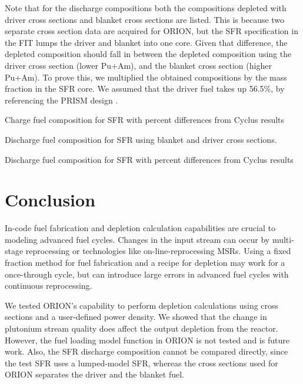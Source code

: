 \documentclass{article}
\begin{document}
Note that for the discharge compositions both the compositions depleted with driver
cross sections and blanket cross sections are listed. This is because two separate
cross section data are acquired for ORION, but the \gls{SFR} specification in the
FIT lumps the driver and blanket into one core. Given that difference, the depleted
composition should fall in between the depleted composition using the driver cross section (lower Pu+Am),
and the blanket cross section (higher Pu+Am). To prove this, we multiplied the
obtained compositions by the mass fraction in the \gls{SFR} core. We assumed that
the driver fuel takes up 56.5\%, by referencing the \gls{PRISM} design \cite{triplett_prism:_2012}.

\begin{table}[h]
    \centering
    \resizebox{\textwidth}{!}{
    }
    \caption{Charge fuel composition for \gls{SFR} with percent differences from
             Cyclus results}
    \label{fig:sfr_charge}
\end{table}


\begin{table}[h]
    \centering
    \resizebox{\textwidth}{!}{
    }
    \caption{Discharge fuel composition for \gls{SFR} using blanket and driver cross sections.}
    \label{fig:sfr_charge_only}
\end{table}

\begin{table}[h]
    \centering
    \resizebox{\textwidth}{!}{
    }
    \caption{Discharge fuel composition for \gls{SFR} with percent differences from
             Cyclus results}
    \label{fig:sfr_discharge}
\end{table}

\FloatBarrier

\section{Conclusion}
In-code fuel fabrication and depletion calculation capabilities are crucial
to modeling advanced fuel cycles.
Changes in the input stream can occur by multi-stage reprocessing or
technologies like on-line-reprocessing \glspl{MSR}. Using a fixed fraction method
for fuel fabrication and a recipe for depletion may work for a once-through cycle,
but can introduce large errors in advanced fuel cycles with continuous reprocessing.

We tested ORION's capability to perform depletion calculations
using cross sections and a user-defined power density. We showed that
the change in plutonium stream quality does affect the output depletion
from the reactor. However, the fuel loading model function in ORION is not tested
and is future work. Also, the \gls{SFR} discharge composition cannot be
compared directly, since the test \gls{SFR} uses a lumped-model \gls{SFR},
whereas the cross sections used for ORION separates the driver and the blanket fuel.
\end{document}

